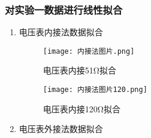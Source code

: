 \documentclass[dvipsnames, svgnames,a4paper,11pt]{article}
\begin{document}
	\subsubsection{对实验一数据进行线性拟合}
	\begin{enumerate}
		\item 电压表内接法数据拟合
		\begin{figure}[H]
			\centering
			\begin{minipage}[b]{0.4\linewidth}
				\centering
				\texttt{[image: 内接法图片.png]}
				\caption{电压表内接51Ω拟合}
				\label{电压表内接51Ω拟合}
			\end{minipage}
			\hfill
			\begin{minipage}[b]{0.4\linewidth}
				\centering
				\texttt{[image: 内接法图片120.png]}
				\caption{电压表内接120Ω拟合}
				\label{电压表内接120Ω拟合}
			\end{minipage}
		\end{figure}

			\item 电压表外接法数据拟合
			

\end{enumerate}
\end{document}
